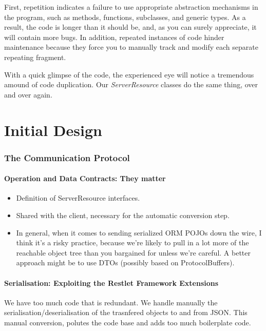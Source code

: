 \documentclass[12pt]{scrartcl}
\begin{document}
First, repetition indicates a failure to use appropriate abstraction mechanisms in the program, such as methods, functions, subclasses, and generic types. As a result, the code is longer than it should be, and, as you can surely appreciate, it will contain more bugs. In addition, repeated instances of code hinder maintenance because they force you to manually track and modify each separate repeating fragment. \cite{Spinellis:2006:CQO:1197266}

With a quick glimpse of the code, the experienced eye will notice a tremendous amound of code duplication. Our \emph{ServerResource} classes do the same thing, over and over again.

\newpage
\part{Initial Design}


\section{The Communication Protocol}

\subsection{Operation and Data Contracts: They matter}

\begin{itemize}
\item Definition of ServerResource interfaces.
\item Shared with the client, necessary for the automatic conversion step.
\item In general, when it comes to sending serialized ORM POJOs down the wire, I think it's a risky practice, because we're likely to pull in a lot more of the reachable object tree than you bargained for unless we're careful. A better approach might be to use DTOs (possibly based on ProtocolBuffers).
\end{itemize}

\subsection{Serialisation: Exploiting the Restlet Framework Extensions} 


We have too much code that is redundant. We handle manually the serialisation/deserialisation of the trasnfered objects to and from JSON. This manual conversion, polutes the code base and adds too much boilerplate code. 
\end{document}
